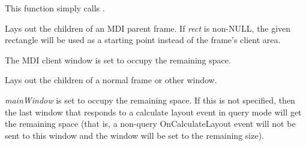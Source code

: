 This function simply calls .

\label{wxlayoutalgorithmlayoutmdiframe}


Lays out the children of an MDI parent frame. If {\it rect} is non-NULL, the
given rectangle will be used as a starting point instead of the frame's client area.

The MDI client window is set to occupy the remaining space.

\label{wxlayoutalgorithmlayoutwindow}


Lays out the children of a normal frame or other window.

{\it mainWindow} is set to occupy the remaining space. If this is not specified, then
the last window that responds to a calculate layout event in query mode will get the remaining space
(that is, a non-query OnCalculateLayout event will not be sent to this window and the window will be set
to the remaining size).


